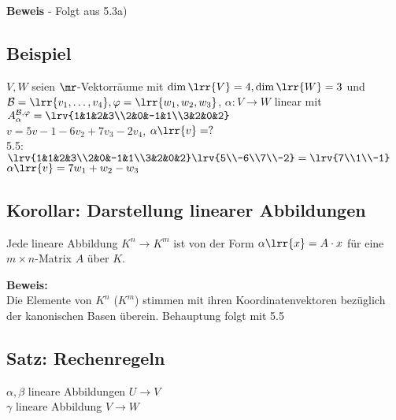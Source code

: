 
	\textbf{Beweis} - Folgt aus 5.3a)

\subsection{Beispiel}
	$V,W$ seien $\mr$-Vektorräume mit $\dim\lrr{V}=4, \dim\lrr{W}=3$ und $\mathcal{B}=\lrr{v_1,\dots,v_4},\varphi=\lrr{w_1,w_2,w_3}$, $\alpha:V\rightarrow W$ linear mit \\
	$A_\alpha^{\mathcal{B},\varphi}=\lrv{1&1&2&3\\2&0&-1&1\\3&2&0&2}$\\
	$v=5v-1-6v_2+7v_3-2v_4$, $\alpha\lrr{v}=?$\\
	5.5:$\lrv{1&1&2&3\\2&0&-1&1\\3&2&0&2}\lrv{5\\-6\\7\\-2}=\lrv{7\\1\\-1}$\\
	$\alpha\lrr{v}=7w_1+w_2-w_3$

\subsection{Korollar: Darstellung linearer Abbildungen}
	Jede lineare Abbildung $K^n\rightarrow K^m$ ist von der Form $\alpha\lrr{x}=A\cdot x$ für eine $m\times n$-Matrix $A$ über $K$.

	\textbf{Beweis:}\\
	Die Elemente von $K^n$ ($K^m$) stimmen mit ihren Koordinatenvektoren bezüglich der kanonischen Basen überein. Behauptung folgt mit 5.5

\subsection{Satz: Rechenregeln}
	$\alpha,\beta$ lineare Abbildungen $U\rightarrow V$\\
	$\gamma$ lineare Abbildung $V\rightarrow W$

